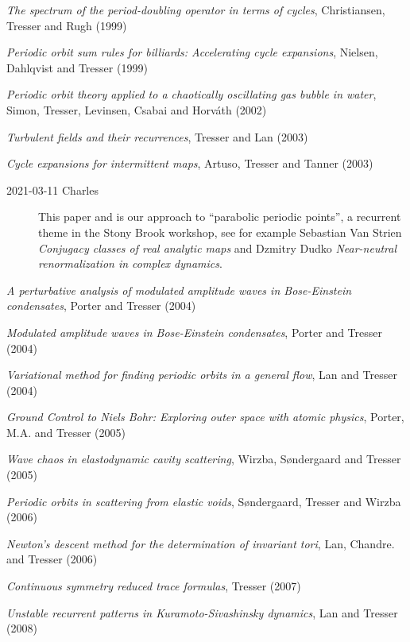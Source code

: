 {{
{\em The spectrum of the period-doubling operator in terms of cycles},
{Christiansen, Tresser and Rugh}
{(1999)}

{\em Periodic orbit sum rules for billiards: {Accelerating} cycle expansions},
{Nielsen,  Dahlqvist and Tresser}
{(1999)}

{\em Periodic orbit theory applied to a chaotically oscillating gas
bubble in water},
{Simon, Tresser, Levinsen, Csabai and Horv\'ath}
{(2002)}

{\em Turbulent fields and their recurrences},
{Tresser and Lan}
{(2003)}

{\em Cycle expansions for intermittent maps},
{Artuso, Tresser and Tanner}
{(2003)}
\begin{description}
  \item[2021-03-11 Charles]
This paper and
is our approach to ``parabolic periodic points'', a recurrent theme in
the Stony Brook workshop, see for example
Sebastian Van Strien
\emph{Conjugacy classes of real analytic maps}
and
Dzmitry Dudko
\emph{Near-neutral renormalization in complex dynamics}.
\end{description}


{\em A perturbative analysis of modulated amplitude waves in {Bose-Einstein} condensates},
{Porter and Tresser}
{(2004)}

{\em Modulated amplitude waves in {Bose-Einstein} condensates},
{Porter and Tresser}
{(2004)}

{\em Variational method for finding periodic orbits in a general flow},
{Lan and Tresser}
{(2004)}

{\em {Ground Control} to {Niels Bohr: Exploring} outer space with atomic physics},
{Porter, M.A. and Tresser}
{(2005)}

{\em Wave chaos in elastodynamic cavity scattering},
{Wirzba, S{\o}ndergaard and Tresser}
{(2005)}

{\em Periodic orbits in scattering from elastic voids},
{S{\o}ndergaard, Tresser and Wirzba}
{(2006)}

{\em {Newton}'s descent method for the determination of invariant tori},
{Lan, Chandre. and Tresser}
{(2006)}

{\em Continuous symmetry reduced trace formulas},
{Tresser}
{(2007)}

{\em Unstable recurrent patterns in {Kuramoto-Sivashinsky} dynamics},
{Lan and Tresser}
{(2008)}

}}
